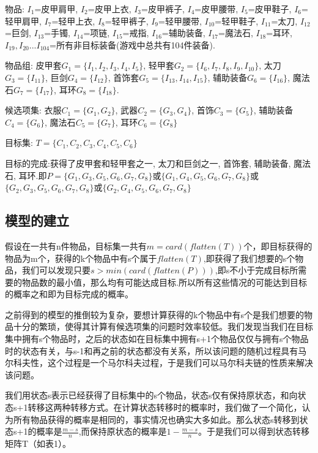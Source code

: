\documentclass[10pt,journal,compsoc]{IEEEtran}
\begin{document}
  物品: $I_1$=皮甲肩甲, $I_2$=皮甲上衣, $I_3$=皮甲裤子, $I_4$=皮甲腰带, $I_5$=皮甲鞋子, $I_6$=轻甲肩甲, $I_7$=轻甲上衣, $I_8$=轻甲裤子, $I_9$=轻甲腰带, $I_{10}$=轻甲鞋子, $I_{11}$=太刀, $I_{12}$=巨剑, $I_{13}$=手镯, $I_{14}$=项链, $I_{15}$=戒指, $I_{16}$=辅助装备, $I_{17}$=魔法石, $I_{18}$=耳环, $I_{19},I_{20}...I_{104}$=所有非目标装备(游戏中总共有104件装备). 
  
  物品组: 皮甲套$G_1=\{I_1, I_2, I_3, I_4, I_5\}$, 轻甲套$G_2=\{I_6, I_7, I_8, I_9, I_{10}\}$, 太刀$G_3=\{I_{11}\}$, 巨剑$G_4=\{I_{12}\}$, 首饰套$G_5=\{I_{13}, I_{14}, I_{15}\}$, 辅助装备$G_6=\{I_{16}\}$, 魔法石$G_7=\{I_{17}\}$, 耳环$G_8=\{I_{18}\}$.

  候选项集: 衣服$C_1=\{G_1, G_2\}$, 武器$C_2=\{G_3, G_4\}$, 首饰$C_3=\{G_5\}$, 辅助装备$C_4=\{G_6\}$, 魔法石$C_5=\{G_7\}$, 耳环$C_6=\{G_8\}$

  目标集: $T=\{C_1, C_2, C_3, C_4, C_5, C_6\}$

  目标的完成:获得了皮甲套和轻甲套之一, 太刀和巨剑之一, 首饰套, 辅助装备, 魔法石, 耳环.即$P=\{G_{1}, G_{3}, G_{5}, G_{6}, G_{7}, G_{8}\}$或$\{G_{1}, G_{4}, G_{5}, G_{6}, G_{7}, G_{8}\}$或$\{G_{2}, G_{3}, G_{5}, G_{6}, G_{7}, G_{8}\}$或$\{G_{2}, G_{4}, G_{5}, G_{6}, G_{7}, G_{8}\}$


  \subsection{模型的建立}
  假设在一共有n件物品，目标集一共有$m = card(flatten(T))$个，即目标获得的物品为m个，获得的k个物品中有s个属于$flatten(T)$,即获得了我们想要的s个物品，我们可以发现只要$s>min(card(flatten(P)))$,即s不小于完成目标所需要的物品数的最小值，那么均有可能达成目标.所以所有这些情况的可能达到目标的概率之和即为目标完成的概率。 
  
  之前得到的模型的推倒较为复杂，要想计算获得的k个物品中有s个是我们想要的物品十分的繁琐，使得其计算有候选项集的问题时效率较低。我们发现当我们在目标集中拥有s个物品时，之后的状态如在目标集中拥有s+1个物品仅仅与拥有s个物品时的状态有关，与s-1和再之前的状态都没有关系，所以该问题的随机过程具有马尔科夫性，这个过程是一个马尔科夫过程，于是我们可以马尔科夫链的性质来解决该问题。

  我们用状态s表示已经获得了目标集中的s个物品，状态s仅有保持原状态，和向状态s+1转移这两种转移方式。在计算状态转移时的概率时，我们做了一个简化，认为所有物品获得的概率是相同的，事实情况也确实大多如此。那么状态s转移到状态s+1的概率是$\frac{m-s}{n}$,而保持原状态的概率是$1-\frac{m-s}{n}$。于是我们可以得到状态转移矩阵T（如表1）。
\end{document}
